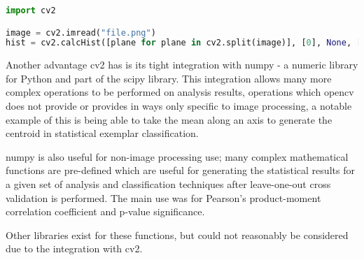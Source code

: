 \begin{lstlisting}[language=python, caption={Creating a Histogram in OpenCV cv2},
label=lst:cv2-hist, breaklines=true, frame=single]
import cv2

image = cv2.imread("file.png")
hist = cv2.calcHist([plane for plane in cv2.split(image)], [0], None, [255,255,255], [0,255,0,255,0,255])
\end{lstlisting}

Another advantage \gls{cv2} has is its tight integration with numpy - a numeric library for Python
and part of the scipy library. This integration allows many more complex operations to be 
performed on analysis results, operations which \gls{opencv} does not provide or provides in ways
only specific to image processing, a notable example of this is being able to take the mean along
an axis to generate the centroid in statistical exemplar classification.

numpy is also useful for non-image processing use; many complex mathematical functions are 
pre-defined which are useful for generating the statistical results for a given set of analysis
and classification techniques after leave-one-out cross validation is performed. The main use was
for Pearson's product-moment correlation coefficient and p-value significance.

Other libraries exist for these functions, but could not reasonably be considered due to the 
integration with \gls{cv2}.
